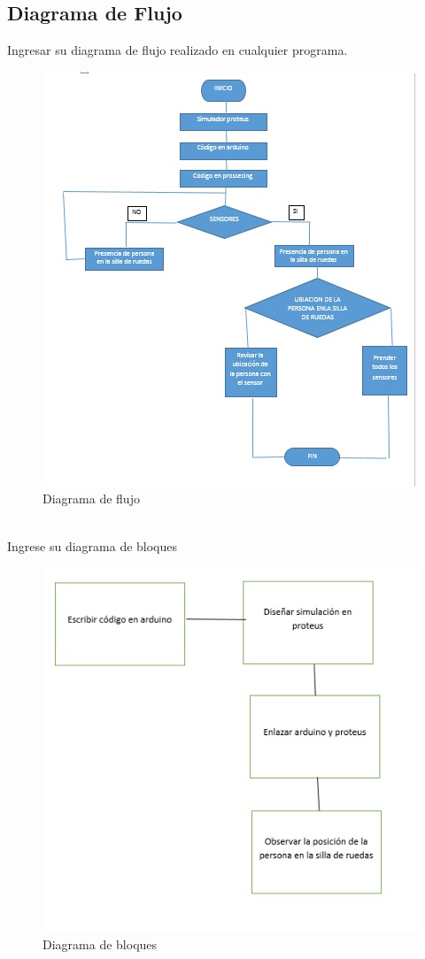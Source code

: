 \documentclass[10pt,a4paper]{article}
\begin{document}
\subsection{Diagrama de Flujo}
Ingresar su diagrama de flujo realizado en cualquier programa.
\begin{figure}[ht!]
\caption{Diagrama de flujo} %
\centering
\includegraphics[scale=0.4]{DIAGRAMA DE FLUJO.jpg} %
\end{figure}\\ %
Ingrese su diagrama de bloques
\begin{figure}[hbt!]
\caption{Diagrama de bloques} %
\centering
\includegraphics[scale=0.25]{DIAGRAMA DE BLOQUES.jpg}
\end{figure}
\end{document}
